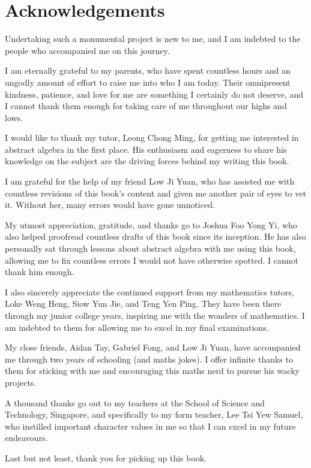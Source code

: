 \chapter{Acknowledgements}
Undertaking such a monumental project is new to me, and I am indebted to the people who accompanied me on this journey.

I am eternally grateful to my parents, who have spent countless hours and an ungodly amount of effort to raise me into who I am today. Their omnipresent kindness, patience, and love for me are something I certainly do not deserve, and I cannot thank them enough for taking care of me throughout our highs and lows.

I would like to thank my tutor, Leong Chong Ming, for getting me interested in abstract algebra in the first place. His enthusiasm and eagerness to share his knowledge on the subject are the driving forces behind my writing this book.

I am grateful for the help of my friend Low Ji Yuan, who has assisted me with countless revisions of this book's content and given me another pair of eyes to vet it. Without her, many errors would have gone unnoticed.

My utmost appreciation, gratitude, and thanks go to Joshua Foo Yong Yi, who also helped proofread countless drafts of this book since its inception. He has also personally sat through lessons about abstract algebra with me using this book, allowing me to fix countless errors I would not have otherwise spotted. I cannot thank him enough.

I also sincerely appreciate the continued support from my mathematics tutors, Loke Weng Heng, Siow Yun Jie, and Teng Yen Ping. They have been there through my junior college years, inspiring me with the wonders of mathematics. I am indebted to them for allowing me to excel in my final examinations.

My close friends, Aidan Tay, Gabriel Fong, and Low Ji Yuan, have accompanied me through two years of schooling (and maths jokes). I offer infinite thanks to them for sticking with me and encouraging this maths nerd to pursue his wacky projects.

A thousand thanks go out to my teachers at the School of Science and Technology, Singapore, and specifically to my form teacher, Lee Tsi Yew Samuel, who instilled important character values in me so that I can excel in my future endeavours.

Last but not least, thank you for picking up this book.


